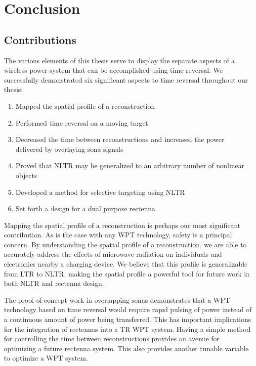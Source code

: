 \chapter{Conclusion}

\label{ch:conclusion}

\section{Contributions}

The various elements of this thesis serve to display the separate aspects of a wireless power system that can be accomplished using time reversal. We successfully demonstrated six significant aspects to time reversal throughout our thesis:

\begin{enumerate}
\item Mapped the spatial profile of a reconstruction
\item Performed time reversal on a moving target
\item Decreased the time between reconstructions and increased the power delivered by overlaying sona signals
\item Proved that NLTR may be generalized to an arbitrary number of nonlinear objects
\item Developed a method for selective targeting using NLTR
\item Set forth a design for a dual purpose rectenna
\end{enumerate}

Mapping the spatial profile of a reconstruction is perhaps our most significant contribution. As is the case with any WPT technology, safety is a principal concern. By understanding the spatial profile of a reconstruction, we are able to accurately address the effects of microwave radiation on individuals and electronics nearby a charging device. We believe that this profile is generalizable from LTR to NLTR, making the spatial profile a powerful tool for future work in both NLTR and rectenna design.

The proof-of-concept work in overlapping sonas demonstrates that a WPT technology based on time reversal would require rapid pulsing of power instead of a continuous amount of power being transferred. This has important implications for the integration of rectennas into a TR WPT system. Having a simple method for controlling the time between reconstructions provides an avenue for optimizing a future rectenna system. This also provides another tunable variable to optimize a WPT system.

